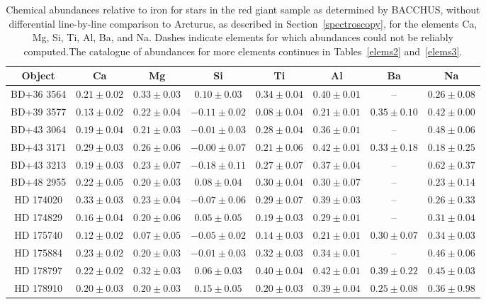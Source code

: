 \begin{table*}
\caption{Chemical abundances relative to iron for stars in the red giant sample as determined by BACCHUS, without differential line-by-line comparison to Arcturus, as described in Section~\ref{spectroscopy}, for the elements Ca, Mg, Si, Ti, Al, Ba, and Na. Dashes indicate elements for which abundances could not be reliably computed.The catalogue of abundances for more elements continues in Tables~\ref{elems2} and~\ref{elems3}.\label{elems1}}
\begin{tabular}{cccccccc}
\hline \hline
Object & Ca & Mg & Si & Ti & Al & Ba & Na \\
\hline
BD+36 3564 & $0.21 \pm 0.02$ & $0.33 \pm 0.03$ & $0.10 \pm 0.03$ & $0.34 \pm 0.04$ & $0.40 \pm 0.01$ & -- & $0.26 \pm 0.08$ \\
BD+39 3577 & $0.13 \pm 0.02$ & $0.22 \pm 0.04$ & $-0.11 \pm 0.02$ & $0.08 \pm 0.04$ & $0.21 \pm 0.01$ & $0.35 \pm 0.10$ & $0.42 \pm 0.00$ \\
BD+43 3064 & $0.19 \pm 0.04$ & $0.21 \pm 0.03$ & $-0.01 \pm 0.03$ & $0.28 \pm 0.04$ & $0.36 \pm 0.01$ & -- & $0.48 \pm 0.06$ \\
BD+43 3171 & $0.29 \pm 0.03$ & $0.26 \pm 0.06$ & $-0.00 \pm 0.07$ & $0.21 \pm 0.06$ & $0.42 \pm 0.01$ & $0.33 \pm 0.18$ & $0.18 \pm 0.25$ \\
BD+43 3213 & $0.19 \pm 0.03$ & $0.23 \pm 0.07$ & $-0.18 \pm 0.11$ & $0.27 \pm 0.07$ & $0.37 \pm 0.04$ & -- & $0.62 \pm 0.37$ \\
BD+48 2955 & $0.22 \pm 0.05$ & $0.20 \pm 0.03$ & $0.08 \pm 0.04$ & $0.30 \pm 0.04$ & $0.30 \pm 0.07$ & -- & $0.23 \pm 0.14$ \\
HD 174020 & $0.33 \pm 0.03$ & $0.23 \pm 0.04$ & $-0.07 \pm 0.06$ & $0.29 \pm 0.07$ & $0.39 \pm 0.03$ & -- & $0.26 \pm 0.33$ \\
HD 174829 & $0.16 \pm 0.04$ & $0.20 \pm 0.06$ & $0.05 \pm 0.05$ & $0.19 \pm 0.03$ & $0.29 \pm 0.01$ & -- & $0.31 \pm 0.04$ \\
HD 175740 & $0.12 \pm 0.02$ & $0.07 \pm 0.05$ & $-0.05 \pm 0.02$ & $0.14 \pm 0.03$ & $0.21 \pm 0.01$ & $0.30 \pm 0.07$ & $0.34 \pm 0.03$ \\
HD 175884 & $0.23 \pm 0.02$ & $0.20 \pm 0.03$ & $-0.01 \pm 0.03$ & $0.32 \pm 0.03$ & $0.34 \pm 0.01$ & -- & $0.46 \pm 0.06$ \\
HD 178797 & $0.22 \pm 0.02$ & $0.32 \pm 0.03$ & $0.06 \pm 0.03$ & $0.40 \pm 0.04$ & $0.42 \pm 0.01$ & $0.39 \pm 0.22$ & $0.45 \pm 0.03$ \\
HD 178910 & $0.20 \pm 0.03$ & $0.20 \pm 0.03$ & $0.15 \pm 0.05$ & $0.20 \pm 0.03$ & $0.39 \pm 0.04$ & $0.25 \pm 0.08$ & $0.36 \pm 0.98$ \\

\end{tabular}
\end{table*}

